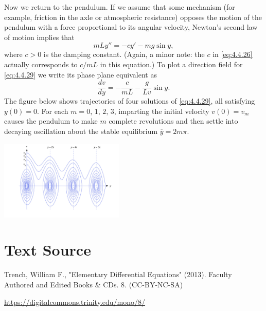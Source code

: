 \documentclass{ximera}
\begin{document}
 
\begin{example}\label{example:4.4.5}
Now we
return to the pendulum. If we assume that
some mechanism (for example, friction in the axle or atmospheric
resistance) opposes the motion of the pendulum with a force
proportional to its angular velocity,  Newton's second law of
motion implies that
\begin{equation} \label{eq:4.4.29}
mLy''=-cy'-mg\sin y,
\end{equation}
where $c>0$ is the damping constant. (Again, a minor note: the $c$
in \eqref{eq:4.4.26} actually corresponds to $c/mL$ in this equation.)
To plot a direction field for \eqref{eq:4.4.29} we write its phase plane
equivalent as
$$
\frac{dv}{dy}=-\frac{c}{mL}-\frac{g}{Lv}\sin y.
$$
The figure below shows
trajectories of four solutions of \eqref{eq:4.4.29}, all satisfying
$y(0)=0$. For each $m=0$, $1$, $2$, $3$, imparting the initial velocity
$v(0)=v_m$ causes the pendulum to make $m$ complete revolutions and
then settle into decaying oscillation about the stable equilibrium
$\overline{y}=2m\pi$.
 
\begin{image}
 \includegraphics[height=1.5in]{fig040415.jpg}
\end{image}
 
 
\end{example}
 
 
 
 
 
 
\section*{Text Source}
Trench, William F., "Elementary Differential Equations" (2013). Faculty Authored and Edited Books \& CDs. 8. (CC-BY-NC-SA)
 
\href{https://digitalcommons.trinity.edu/mono/8/}{https://digitalcommons.trinity.edu/mono/8/}
 
 
\end{document}

